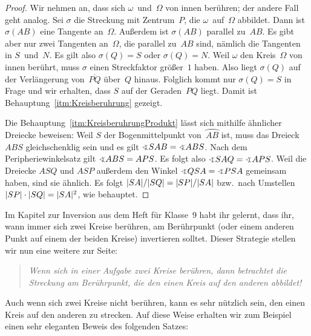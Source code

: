 \begin{proof}
	Wir nehmen an, dass sich $\omega$~und~$\Omega$ von innen berühren; der andere Fall geht analog. Sei $\sigma$ die Streckung mit Zentrum~$P$, die $\omega$~auf~$\Omega$ abbildet. Dann ist $\sigma(AB)$ eine Tangente an~$\Omega$. Außerdem ist $\sigma(AB)$ parallel zu~$AB$. Es gibt aber nur zwei Tangenten an~$\Omega$, die parallel zu~$AB$ sind, nämlich die Tangenten in $S$~und~$N$. Es gilt also $\sigma(Q)=S$ oder $\sigma(Q)=N$. Weil $\omega$ den Kreis~$\Omega$ von innen berührt, muss $\sigma$ einen Streckfaktor
	größer~$1$ haben. Also liegt $\sigma(Q)$ auf der Verlängerung von~$\overline{PQ}$ über~$Q$ hinaus. Folglich kommt nur $\sigma(Q)=S$ in Frage und wir erhalten, dass $S$ auf der Geraden~$PQ$ liegt. Damit ist Behauptung~\ref{itm:Kreisberuhrung} gezeigt.
	
	Die Behauptung~\ref{itm:KreisberuhrungProdukt} lässt sich mithilfe ähnlicher Dreiecke beweisen: Weil $S$ der Bogenmittelpunkt von~$\wideparen{AB}$ ist, muss das Dreieck $ABS$ gleichschenklig sein und es gilt $\winkel SAB=\winkel ABS$. Nach dem Peripheriewinkelsatz gilt $\winkel ABS=APS$. Es folgt also $\winkel SAQ=\winkel APS$. Weil die Dreiecke $ASQ$ und $ASP$ außerdem den Winkel $\winkel QSA=\winkel PSA$ gemeinsam haben, sind sie ähnlich. Es folgt $\lvert SA\rvert/\lvert SQ\rvert=\lvert SP\rvert/\lvert SA\rvert$ bzw.\ nach Umstellen $\lvert SP\rvert\cdot\lvert SQ\rvert=\lvert SA\rvert^2$, wie behauptet.
\end{proof}

Im Kapitel zur Inversion aus dem Heft für Klasse~9 habt ihr gelernt, dass ihr, wann immer sich zwei Kreise berühren, am Berührpunkt (oder einem anderen Punkt auf einem der beiden Kreise) invertieren solltet. Dieser Strategie stellen wir nun eine weitere zur Seite:
\begin{quote}\itshape
	Wenn sich in einer Aufgabe zwei Kreise berühren, dann betrachtet die Streckung am Berührpunkt, die den einen Kreis auf den anderen abbildet!
\end{quote}
Auch wenn sich zwei Kreise nicht berühren, kann es sehr nützlich sein, den einen Kreis auf den anderen zu strecken. Auf diese Weise erhalten wir zum Beispiel einen sehr eleganten Beweis des folgenden Satzes:

